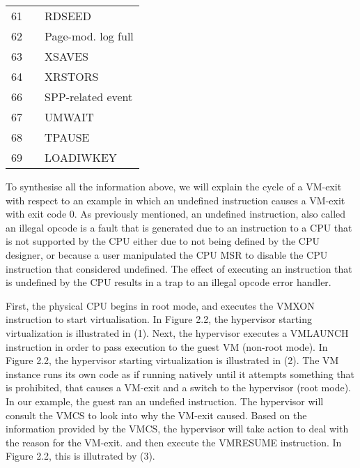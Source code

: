 \documentclass{report}
\begin{document}
\begin{spacing}{1.5}
\begin{longtable}{lcl}
\large{61}  & &   \large{RDSEED} \\
\large{62}  & &   \large{Page-mod. log full} \\
\large{63}  & &   \large{XSAVES} \\
\large{64}  & &   \large{XRSTORS} \\
\large{66}  & &   \large{SPP-related event} \\
\large{67}  & &   \large{UMWAIT} \\
\large{68}  & &   \large{TPAUSE} \\
\large{69}  & &   \large{LOADIWKEY} \\
\end{longtable}

{\large
To synthesise all the information above, we will explain the cycle of a VM-exit with respect to an example in which an undefined instruction causes a VM-exit with exit code 0. As previously mentioned, an undefined instruction, also called an illegal opcode is a fault that is generated due to an instruction to a CPU that is not supported by the CPU either due to not being defined by the CPU designer, or because a user manipulated the CPU MSR to disable the CPU instruction that considered undefined. The effect of executing an instruction that is undefined by the CPU results in a trap to an illegal opcode error handler. 
\newline
}


{\large
First, the physical CPU begins in root mode, and executes the VMXON instruction to start virtualisation. In Figure 2.2, the hypervisor starting virtualization is illustrated in (1). Next, the hypervisor executes a VMLAUNCH instruction in order to pass execution to the guest VM (non-root mode). In Figure 2.2, the hypervisor starting virtualization is illustrated in (2). The VM instance runs its own code as if running natively until it attempts something that is prohibited, that causes a VM-exit and a switch to the hypervisor (root mode). In our example, the guest ran an undefied instruction. The hypervisor will consult the VMCS to look into why the VM-exit caused. Based on the information provided by the VMCS, the hypervisor will take action to deal with the reason for the VM-exit. and then execute the VMRESUME instruction. In Figure 2.2, this is illutrated by (3).
}


























\end{spacing}
\end{document}
